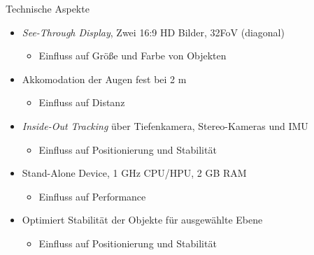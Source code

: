 \begin{frame}[fragile]{Technische Aspekte}
		\begin{itemize}
			\pause
			\item \textit{See-Through Display}, Zwei 16:9 HD Bilder, 32\degree FoV (diagonal)
			\begin{itemize}[topsep=-5px]
				\setlength{\itemsep}{-5px}
				\item Einfluss auf Größe und Farbe von Objekten
			\end{itemize}
			\pause
			\item Akkomodation der Augen fest bei 2 m
			\begin{itemize}[topsep=-5px]
				\setlength{\itemsep}{-5px}
				\item Einfluss auf Distanz
			\end{itemize}
			\pause
			\item \textit{Inside-Out Tracking} über Tiefenkamera, Stereo-Kameras und IMU
			\begin{itemize}[topsep=-5px]
				\setlength{\itemsep}{-5px}
				\item Einfluss auf Positionierung und Stabilität
			\end{itemize}
			\pause
			\item Stand-Alone Device, 1 GHz CPU/HPU, 2 GB RAM
			\begin{itemize}[topsep=-5px]
				\setlength{\itemsep}{-5px}
				\item Einfluss auf Performance
			\end{itemize}
		\pause
			\item Optimiert Stabilität der Objekte für ausgewählte Ebene
			\begin{itemize}[topsep=-5px]
				\setlength{\itemsep}{-5px}
				\item Einfluss auf Positionierung und Stabilität
			\end{itemize}
		\end{itemize}
\end{frame}

